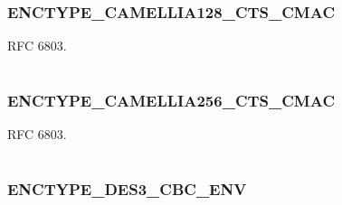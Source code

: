 \documentclass[letterpaper,10pt,english]{sphinxmanual}
\begin{document}
\subsubsection{ENCTYPE\_CAMELLIA128\_CTS\_CMAC}
\label{appdev/refs/macros/ENCTYPE_CAMELLIA128_CTS_CMAC:enctype-camellia128-cts-cmac-data}\label{appdev/refs/macros/ENCTYPE_CAMELLIA128_CTS_CMAC:enctype-camellia128-cts-cmac}\label{appdev/refs/macros/ENCTYPE_CAMELLIA128_CTS_CMAC::doc}

\begin{fulllineitems}
\label{appdev/refs/macros/ENCTYPE_CAMELLIA128_CTS_CMAC:ENCTYPE_CAMELLIA128_CTS_CMAC}
\end{fulllineitems}


RFC 6803.

\begin{tabulary}{\linewidth}{|L|L|}
\hline

 & 
\\
\hline\end{tabulary}



\subsubsection{ENCTYPE\_CAMELLIA256\_CTS\_CMAC}
\label{appdev/refs/macros/ENCTYPE_CAMELLIA256_CTS_CMAC:enctype-camellia256-cts-cmac-data}\label{appdev/refs/macros/ENCTYPE_CAMELLIA256_CTS_CMAC:enctype-camellia256-cts-cmac}\label{appdev/refs/macros/ENCTYPE_CAMELLIA256_CTS_CMAC::doc}

\begin{fulllineitems}
\label{appdev/refs/macros/ENCTYPE_CAMELLIA256_CTS_CMAC:ENCTYPE_CAMELLIA256_CTS_CMAC}
\end{fulllineitems}


RFC 6803.

\begin{tabulary}{\linewidth}{|L|L|}
\hline

 & 
\\
\hline\end{tabulary}



\subsubsection{ENCTYPE\_DES3\_CBC\_ENV}
\label{appdev/refs/macros/ENCTYPE_DES3_CBC_ENV::doc}\label{appdev/refs/macros/ENCTYPE_DES3_CBC_ENV:enctype-des3-cbc-env}\label{appdev/refs/macros/ENCTYPE_DES3_CBC_ENV:enctype-des3-cbc-env-data}
\end{document}

